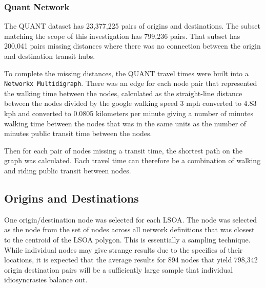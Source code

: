 
 
\subsubsection{Quant Network}

The QUANT dataset has 23,377,225 pairs of origins and destinations. The subset matching the scope of this investigation has 799,236 pairs. That subset has 200,041 pairs missing distances where there was no connection between the origin and destination transit hubs.

To complete the missing distances, the QUANT travel times were built into a \texttt{Networkx Multidigraph}. There was an edge for each node pair that represented the walking time between the nodes, calculated as the straight-line distance between the nodes divided by the google walking speed 3 mph converted to 4.83 kph and converted to 0.0805 kilometers per minute giving a number of minutes walking time between the nodes that was in the same units as the number of minutes public transit time between the nodes. 

Then for each pair of nodes missing a transit time, the shortest path on the graph was calculated. Each travel time can therefore be a combination of walking and riding public transit between nodes. 

\subsection{Origins and Destinations}

One origin/destination node was selected for each LSOA. The node was selected as the node from the set of nodes across all network definitions that was closest to the centroid of the LSOA polygon. This is essentially a sampling technique. While individual nodes may give strange results due to the specifics of their locations, it is expected that the average results for 894 nodes that yield 798,342 origin destination pairs will be a sufficiently large sample that individual idiosyncrasies balance out. 

